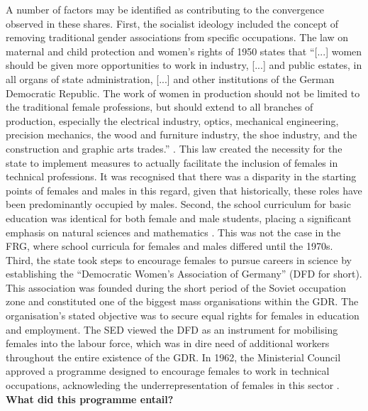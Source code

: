 \documentclass[a4paper, oneside, hyperfootnotes = false]{article}
\begin{document}
{%
A number of factors may be identified as contributing to the convergence observed in these shares.
First, the socialist ideology included the concept of removing traditional gender associations from specific occupations.
The law on maternal and child protection and women's rights of 1950 states that ``[...] women should be given more opportunities to work in industry, [...] and public estates, in all organs of state administration, [...] and other institutions of the German Democratic Republic.
The work of women in production should not be limited to the traditional female professions, but should extend to all branches of production, especially the electrical industry, optics, mechanical engineering, precision mechanics, the wood and furniture industry, the shoe industry, and the construction and graphic arts trades.'' \citep[§19.1]{GBl1950}.
This law created the necessity for the state to implement measures to actually facilitate the inclusion of females in technical professions.
It was recognised that there was a disparity in the starting points of females and males in this regard, given that historically, these roles have been predominantly occupied by males.
Second, the school curriculum for basic education was identical for both female and male students, placing a significant emphasis on natural sciences and mathematics \citep{FuchsSchuendeln2016, Campa2019, Davoli2021}.
This was not the case in the FRG, where school curricula for females and males differed until the 1970s.
Third, the state took steps to encourage females to pursue careers in science by establishing the ``Democratic Women's Association of Germany'' (DFD for short).
This association was founded during the short period of the Soviet occupation zone and constituted one of the biggest mass organisations within the GDR.
The organisation's stated objective was to secure equal rights for females in education and employment.
The SED viewed the DFD as an instrument for mobilising females into the labour force, which was in dire need of additional workers throughout the entire existence of the GDR.
In 1962, the Ministerial Council approved a programme designed to encourage females to work in technical occupations, acknowleding the underrepresentation of females in this sector \citep[Chapter~2]{Menschik1974}.
\textbf{What did this programme entail?}


}
\end{document}
